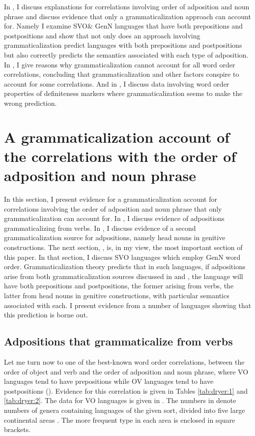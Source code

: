 \documentclass[output=paper]{langsci/langscibook}
\begin{document}
In , I discuss explanations for correlations involving order of adposition and noun phrase and discuss evidence that only a grammaticalization approach can account for. Namely I examine SVO\& GenN languages that have both prepositions and postpositions and show that not only does an approach involving grammaticalization predict languages with both prepositions and postpositions but also correctly predicts the semantics associated with each type of adposition. 
In , I give reasons why grammaticalization cannot account for all word order correlations, concluding that grammaticalization and other factors conspire to account for some correlations. 
And in , I discuss data involving word order properties of definiteness markers where grammaticalization seems to make the wrong prediction.

\section{A grammaticalization account of the correlations with the order of adposition and noun phrase} \label{sec:dryer:2}

In this section, I present evidence for a grammaticalization account for correlations involving the order of adposition and noun phrase that only grammaticalization can account for. In , I discuss evidence of adpositions grammaticalizing from verbs. In , I discuss evidence of a second grammaticalization source for adpositions, namely head nouns in genitive constructions. The next section, , is, in my view, the most important section of this paper. In that section, I discuss SVO languages which employ GenN word order. Grammaticalization theory predicts that in such languages, if adpositions arise from both grammaticalization sources discussed in  and , the language will have both prepositions and postpositions, the former arising from verbs, the latter from head nouns in genitive constructions, with particular semantics associated with each. I present evidence from a number of languages showing that this prediction is borne out.

\subsection{Adpositions that grammaticalize from verbs}\label{sec:dryer:2.1}

Let me turn now to one of the best-known word order correlations, between the order of object and verb and the order of adposition and noun phrase, where VO languages tend to have prepositions while OV languages tend to have postpositions (\citealt{Greenberg1963,Dryer1992}). Evidence for this correlation is given in Tables \ref{tab:dryer:1} and \ref{tab:dryer:2}. The data for VO languages is given in . The numbers in  denote numbers of genera containing languages of the given sort, divided into five large continental areas \citep{Dryer1989}. The more frequent type in each area is enclosed in square brackets.
\end{document}
